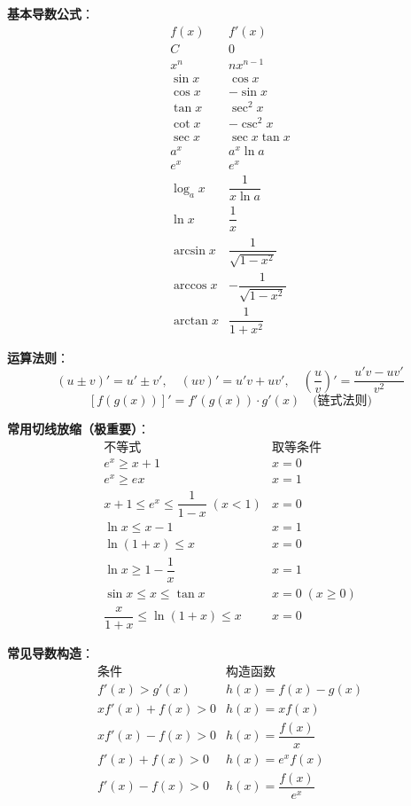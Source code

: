 \textbf{基本导数公式}：
\[
\begin{array}{c|c}
f(x) & f'(x) \\ \hline
C & 0 \\
x^n & nx^{n-1} \\
\sin x & \cos x \\
\cos x & -\sin x \\
\tan x & \sec^2 x \\
\cot x & -\csc^2 x \\
\sec x & \sec x\tan x \\
a^x & a^x\ln a \\
e^x & e^x \\
\log_a x & \dfrac{1}{x\ln a} \\
\ln x & \dfrac{1}{x} \\
\arcsin x & \dfrac{1}{\sqrt{1-x^2}} \\
\arccos x & -\dfrac{1}{\sqrt{1-x^2}} \\
\arctan x & \dfrac{1}{1+x^2}
\end{array}
\]

\textbf{运算法则}：
\[
(u \pm v)' = u' \pm v',\quad (uv)' = u'v + uv',\quad \left(\frac{u}{v}\right)' = \frac{u'v - uv'}{v^2}
\]
\[
\left[f(g(x))\right]' = f'(g(x)) \cdot g'(x) \quad\text{(链式法则)}
\]

\textbf{常用切线放缩（极重要）}：
\[
\begin{array}{c|c}
\text{不等式} & \text{取等条件} \\ \hline
e^x \ge x+1 & x = 0 \\
e^x \ge ex & x = 1 \\
x+1 \le e^x \le \dfrac{1}{1-x}\;(x<1) & x=0 \\
\ln x \le x-1 & x = 1 \\
\ln(1+x) \le x & x = 0 \\
\ln x \ge 1 - \dfrac{1}{x} & x = 1 \\
\sin x \le x \le \tan x & x = 0\;(x\ge 0) \\
\dfrac{x}{1+x} \le \ln(1+x) \le x & x = 0
\end{array}
\]

\textbf{常见导数构造}：
\[
\begin{array}{c|c}
\text{条件} & \text{构造函数} \\ \hline
f'(x) > g'(x) & h(x) = f(x) - g(x) \\
xf'(x) + f(x) > 0 & h(x) = xf(x) \\
xf'(x) - f(x) > 0 & h(x) = \dfrac{f(x)}{x} \\
f'(x) + f(x) > 0 & h(x) = e^x f(x) \\
f'(x) - f(x) > 0 & h(x) = \dfrac{f(x)}{e^x}
\end{array}
\]

